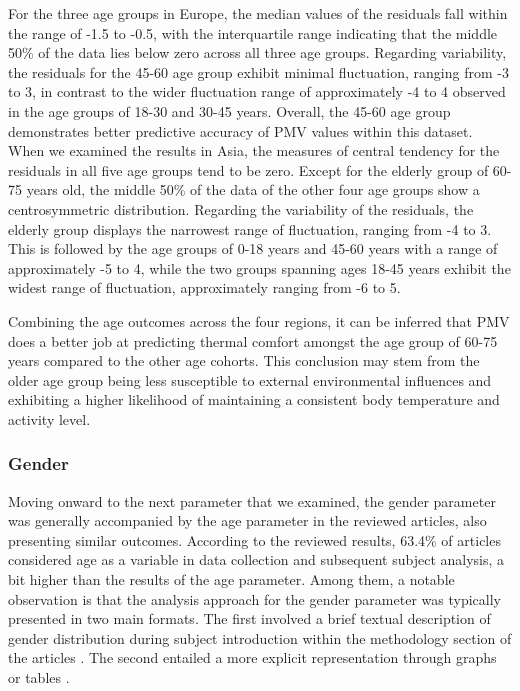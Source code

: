 \documentclass[final,3p,times,12pt]{elsarticle}
\begin{document}
For the three age groups in Europe, the median values of the residuals fall within the range of -1.5 to -0.5, with the interquartile range indicating that the middle 50\% of the data lies below zero across all three age groups. Regarding variability, the residuals for the 45-60 age group exhibit minimal fluctuation, ranging from -3 to 3, in contrast to the wider fluctuation range of approximately -4 to 4 observed in the age groups of 18-30 and 30-45 years. Overall, the 45-60 age group demonstrates better predictive accuracy of PMV values within this dataset. When we examined the results in Asia, the measures of central tendency for the residuals in all five age groups tend to be zero. Except for the elderly group of 60-75 years old, the middle 50\% of the data of the other four age groups show a centrosymmetric distribution. Regarding the variability of the residuals, the elderly group displays the narrowest range of fluctuation, ranging from -4 to 3. This is followed by the age groups of 0-18 years and 45-60 years with a range of approximately -5 to 4, while the two groups spanning ages 18-45 years exhibit the widest range of fluctuation, approximately ranging from -6 to 5.

Combining the age outcomes across the four regions, it can be inferred that PMV does a better job at predicting thermal comfort amongst the age group of 60-75 years compared to the other age cohorts. This conclusion may stem from the older age group being less susceptible to external environmental influences and exhibiting a higher likelihood of maintaining a consistent body temperature and activity level.

\subsubsection{Gender}

Moving onward to the next parameter that we examined, the gender parameter was generally accompanied by the age parameter in the reviewed articles, also presenting similar outcomes. According to the reviewed results, 63.4\% of articles considered age as a variable in data collection and subsequent subject analysis, a bit higher than the results of the age parameter. Among them, a notable observation is that the analysis approach for the gender parameter was typically presented in two main formats. The first involved a brief textual description of gender distribution during subject introduction within the methodology section of the articles \cite{zhouThermalComfortRadiant2019,caoIndividualDistrictHeating2014,manuFieldStudiesThermal2016}. The second entailed a more explicit representation through graphs or tables \cite{boudenAdaptiveThermalComfort2005,caoFieldStudyHuman2011,hawighorstThermospecificSelfefficacySpecSE2016}. 
\end{document}
